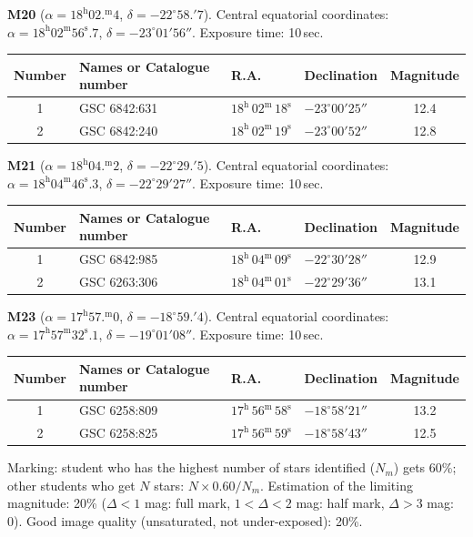 \textbf{M20} ($\alpha = 18^{\mathrm{h}}02.^{\mathrm{m}}4$,
$\delta = -22^\circ 58.'7$). Central equatorial coordinates:
$\alpha = 18^{\mathrm{h}}02^{\mathrm{m}}56^{\mathrm{s}}.7$,
$\delta = -23^\circ 01' 56''$. Exposure time: 10\,sec.

\begin{center}
\begin{tabular}{clllc}
Number & Names or Catalogue number & R.A. & Declination & Magnitude \\
\hline
1 & GSC 6842:631 & $18^{\mathrm{h}}\,02^{\mathrm{m}}\,18^{\mathrm{s}}$ & $-23^\circ 00' 25''$ & 12.4 \\
2 & GSC 6842:240 & $18^{\mathrm{h}}\,02^{\mathrm{m}}\,19^{\mathrm{s}}$ & $-23^\circ 00' 52''$ & 12.8 \\
\end{tabular}
\end{center}

\textbf{M21} ($\alpha = 18^{\mathrm{h}}04.^{\mathrm{m}}2$,
$\delta = -22^\circ 29.'5$). Central equatorial coordinates:
$\alpha = 18^{\mathrm{h}}04^{\mathrm{m}}46^{\mathrm{s}}.3$,
$\delta = -22^\circ 29' 27''$. Exposure time: 10\,sec.

\begin{center}
\begin{tabular}{clllc}
Number & Names or Catalogue number & R.A. & Declination & Magnitude \\
\hline
1 & GSC 6842:985 & $18^{\mathrm{h}}\,04^{\mathrm{m}}\,09^{\mathrm{s}}$ & $-22^\circ 30' 28''$ & 12.9 \\
2 & GSC 6263:306 & $18^{\mathrm{h}}\,04^{\mathrm{m}}\,01^{\mathrm{s}}$ & $-22^\circ 29' 36''$ & 13.1 \\
\end{tabular}
\end{center}

\textbf{M23} ($\alpha = 17^{\mathrm{h}}57.^{\mathrm{m}}0$,
$\delta = -18^\circ 59.'4$). Central equatorial coordinates:
$\alpha = 17^{\mathrm{h}}57^{\mathrm{m}}32^{\mathrm{s}}.1$,
$\delta = -19^\circ 01' 08''$. Exposure time: 10\,sec.

\begin{center}
\begin{tabular}{clllc}
Number & Names or Catalogue number & R.A. & Declination & Magnitude \\
\hline
1 & GSC 6258:809 & $17^{\mathrm{h}}\,56^{\mathrm{m}}\,58^{\mathrm{s}}$ & $-18^\circ 58' 21''$ & 13.2 \\
2 & GSC 6258:825 & $17^{\mathrm{h}}\,56^{\mathrm{m}}\,59^{\mathrm{s}}$ & $-18^\circ 58' 43''$ & 12.5 \\
\end{tabular}
\end{center}

Marking: student who has the highest number of stars identified ($N_m$)
gets 60\%; other students who get $N$ stars: $N \times 0.60/N_m$.
Estimation of the limiting magnitude: 20\% ($\Delta < 1$ mag: full mark,
$1 < \Delta < 2$ mag: half mark, $\Delta > 3$ mag: 0). Good image quality
(unsaturated, not under-exposed): 20\%.
